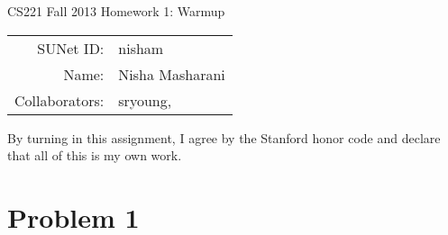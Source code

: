 \documentclass[12pt]{article}
\begin{document}
\begin{center}
{\Large CS221 Fall 2013 Homework 1: Warmup}

\begin{tabular}{rl}
SUNet ID: & nisham \\
Name: & Nisha Masharani \\
Collaborators: & sryoung,
\end{tabular}
\end{center}

By turning in this assignment, I agree by the Stanford honor code and declare
that all of this is my own work.

\section*{Problem 1}
\end{document}
